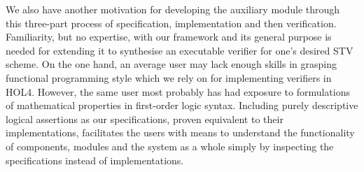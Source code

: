 \documentclass[10pt,conference]{IEEEtran}
\begin{document}
We also have another motivation for developing the auxiliary module through this three-part process of specification, implementation and then verification. Familiarity, but no expertise, with our framework and its general purpose is needed for extending it to synthesise an executable verifier for one's desired STV scheme. On the one hand, an average user may lack enough skills in grasping functional programming style which we rely on for implementing verifiers in HOL4. However, the same user most probably has had exposure to formulations of mathematical properties  in first-order logic syntax. Including purely descriptive logical assertions as our specifications, proven equivalent to their implementations, facilitates the users with means to understand the functionality of components, modules and the system as a whole simply by inspecting the specifications instead of implementations.

\end{document}
